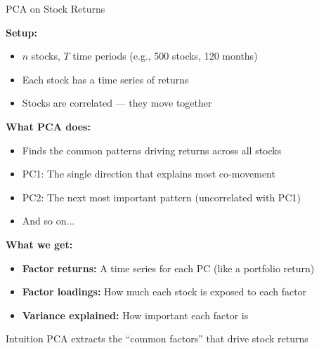 \documentclass[10pt]{beamer}
\begin{document}
\begin{frame}{PCA on Stock Returns}

  \textbf{Setup:}
  \begin{itemize}
    \item $n$ stocks, $T$ time periods (e.g., 500 stocks, 120 months)
    \item Each stock has a time series of returns
    \item Stocks are correlated --- they move together
  \end{itemize}

  \vspace{1em}
  \textbf{What PCA does:}
  \begin{itemize}
    \item Finds the common patterns driving returns across all stocks
    \item PC1: The single direction that explains most co-movement
    \item PC2: The next most important pattern (uncorrelated with PC1)
    \item And so on...
  \end{itemize}

  \vspace{1em}
  \textbf{What we get:}
  \begin{itemize}
    \item \textbf{Factor returns:} A time series for each PC (like a portfolio return)
    \item \textbf{Factor loadings:} How much each stock is exposed to each factor
    \item \textbf{Variance explained:} How important each factor is
  \end{itemize}

  \vspace{0.5em}
  \begin{block}{Intuition}
    PCA extracts the ``common factors'' that drive stock returns
  \end{block}
\end{frame}

\end{document}
